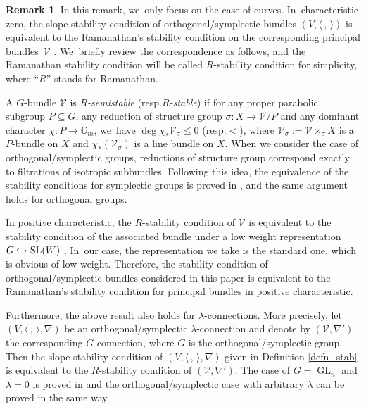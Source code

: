 \documentclass[11pt]{article}
\newcommand{\resp}{resp.\xspace}
\numberwithin{equation}{section}
\newcommand\hto{\mathrel{\lhook\joinrel\to}}
\newcommand{\lconnection}{$\lambda$\nobreakdash-con\-nec\-tion\xspace}
\newcommand{\lconnections}{$\lambda$\nobreakdash-con\-nec\-tions\xspace}
\DeclareMathOperator{\GL}{GL}
\DeclareMathOperator{\SL}{SL}
\theoremstyle{plain}
\theoremstyle{definition}
\newtheorem{rem}[thm]{Remark}
\begin{document}
\begin{rem}
In this remark, we~only focus on the case of curves. In~characteristic zero, the slope stability condition of orthogonal/symplectic bundles $(V, \langle \,, \, \rangle)$ is equivalent to the Ramanathan's stability condition on the corresponding principal bundles~$\mathcal{V}$ \cite{Ra75,Ra96a,Ra96b}. We~briefly review the correspondence as follows, and the Ramanathan stability condition will be called $R$-stability condition for simplicity, where ``$R$'' stands for Ramanathan.

A $G$-bundle $\mathcal{V}$ is \emph{$R$-semistable} (\resp \emph{$R$-stable}) if for any proper parabolic subgroup $P \subseteq G$, any reduction of structure group $\sigma: X \to \mathcal{V}/P$ and any dominant character $\chi: P \to \mathbb{G}_m$, we~have $\deg \chi_* \mathcal{V}_\sigma \leq 0$ (\resp $<$), where $\mathcal{V}_\sigma := \mathcal{V} \times_{\sigma} X$ is a $P$-bundle on $X$ and $\chi_* (\mathcal{V}_\sigma)$ is a line bundle on $X$. When we consider the case of orthogonal/symplectic groups, reductions of structure group correspond exactly to filtrations of isotropic subbundles. Following this idea, the equivalence of the stability conditions for symplectic groups is proved in \cite[App.]{KSZ21}, and the same argument holds for orthogonal groups.

In positive characteristic, the $R$-stability condition of $\mathcal{V}$ is equivalent to the stability condition of the associated bundle under a low weight representation $G \hto \SL(W)$ \cite[\S 2]{BP03}. In~our case, the representation we take is the standard one, which is obvious of low weight. Therefore, the stability condition of orthogonal/symplectic bundles considered in this paper is equivalent to the Ramanathan's stability condition for principal bundles in positive characteristic.

Furthermore, the above result also holds for \lconnections. More precisely, let $(V, \langle \,, \, \rangle, \nabla)$ be an orthogonal/symplectic \lconnection and denote by $(\mathcal{V},\nabla')$ the corresponding $G$-connection, where $G$ is the orthogonal/symplectic group. Then the slope stability condition of $(V, \langle \,, \, \rangle, \nabla)$ given in Definition \ref{defn_stab} is equivalent to the $R$-stability condition of $(\mathcal{V},\nabla')$. The case of $G=\GL_n$ and $\lambda = 0$ is proved in \cite[Prop.\,5.5]{KSZ23} and the orthogonal/symplectic case with arbitrary $\lambda$ can be proved in the same way.
\end{rem}
\end{document}
